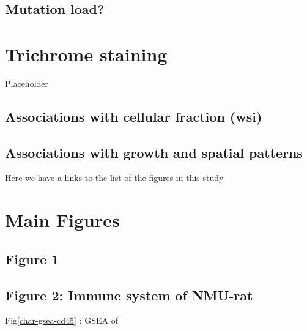 \documentclass[
]{book}
\begin{document}
\hypertarget{mutation-load}{%
\section{Mutation load?}\label{mutation-load}}

\hypertarget{trichrome-staining}{%
\chapter{Trichrome staining}\label{trichrome-staining}}

Placeholder

\hypertarget{associations-with-cellular-fraction-wsi}{%
\section{Associations with cellular fraction (wsi)}\label{associations-with-cellular-fraction-wsi}}

\hypertarget{associations-with-growth-and-spatial-patterns}{%
\section{Associations with growth and spatial patterns}\label{associations-with-growth-and-spatial-patterns}}

\hypertarget{appendix-appendix}{%
\appendix}


Here we have a links to the list of the figures in this study

\hypertarget{main-figures}{%
\chapter{Main Figures}\label{main-figures}}

\hypertarget{figure-1}{%
\section*{Figure 1}\label{figure-1}}

\hypertarget{figure-2-immune-system-of-nmu-rat}{%
\section*{Figure 2: Immune system of NMU-rat}\label{figure-2-immune-system-of-nmu-rat}}

Fig\ref{char-gsea-cd45} : GSEA of \label{fig:char-gsea-cd45}
\end{document}
